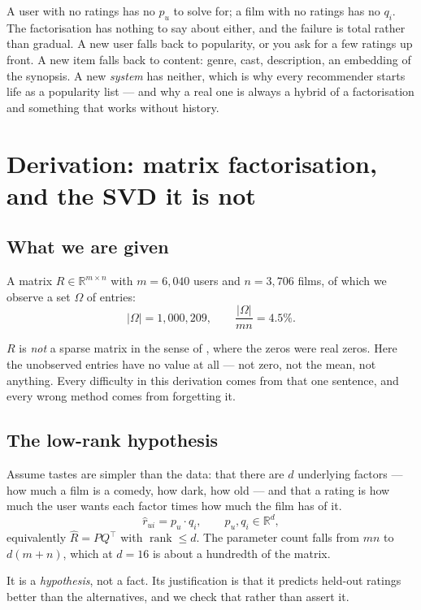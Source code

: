 \documentclass[11pt,a4paper]{article}
\begin{document}
A user with no ratings has no $p_u$ to solve for; a film with no ratings has no
$q_i$. The factorisation has nothing to say about either, and the failure is
total rather than gradual. A new user falls back to popularity, or you ask for
a few ratings up front. A new item falls back to content: genre, cast,
description, an embedding of the synopsis. A new \emph{system} has neither,
which is why every recommender starts life as a popularity list --- and why a
real one is always a hybrid of a factorisation and something that works without
history.

\section{Derivation: matrix factorisation, and the SVD it is not}

\subsection{What we are given}

A matrix $R \in \mathbb{R}^{m\times n}$ with $m = 6{,}040$ users and
$n = 3{,}706$ films, of which we observe a set $\Omega$ of entries:
\[ |\Omega| = 1{,}000{,}209, \qquad \frac{|\Omega|}{mn} = 4.5\%. \]

$R$ is \emph{not} a sparse matrix in the sense of , where the zeros
were real zeros. Here the unobserved entries have no value at all --- not zero,
not the mean, not anything. Every difficulty in this derivation comes from that
one sentence, and every wrong method comes from forgetting it.

\subsection{The low-rank hypothesis}

Assume tastes are simpler than the data: that there are $d$ underlying factors
--- how much a film is a comedy, how dark, how old --- and that a rating is how
much the user wants each factor times how much the film has of it.
\[ \hat r_{ui} = p_u \cdot q_i, \qquad p_u, q_i \in \mathbb{R}^d, \]
equivalently $\hat R = PQ^{\top}$ with $\operatorname{rank} \le d$. The
parameter count falls from $mn$ to $d(m+n)$, which at $d = 16$ is about a
hundredth of the matrix.

It is a \emph{hypothesis}, not a fact. Its justification is that it predicts
held-out ratings better than the alternatives, and we check that rather than
assert it.
\end{document}
